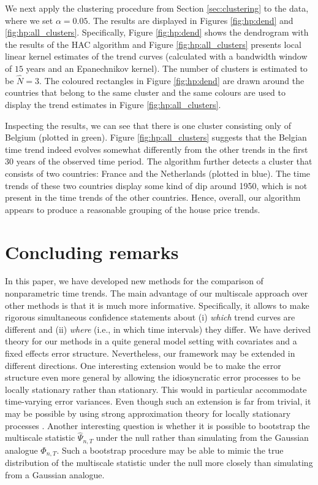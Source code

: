 \documentclass[12pt]{article}
\begin{document}
We next apply the clustering procedure from Section \ref{sec:clustering} to the data, where we set $\alpha = 0.05$. The results are displayed in Figures \ref{fig:hp:dend} and \ref{fig:hp:all_clusters}. Specifically, Figure \ref{fig:hp:dend} shows the dendrogram with the results of the HAC algorithm and Figure \ref{fig:hp:all_clusters} presents local linear kernel estimates of the trend curves (calculated with a bandwidth window of $15$ years and an Epanechnikov kernel). The number of clusters is estimated to be $\widehat{N} = 3$. The coloured rectangles in Figure \ref{fig:hp:dend} are drawn around the countries that belong to the same cluster and the same colours are used to display the trend estimates in Figure \ref{fig:hp:all_clusters}.


Inspecting the results, we can see that there is one cluster consisting only of Belgium (plotted in green). Figure \ref{fig:hp:all_clusters} suggests that the Belgian time trend indeed evolves somewhat differently from the other trends in the first $30$ years of the observed time period. %
The algorithm further detects a cluster that consists of two countries: France and the Netherlands (plotted in blue). The time trends of these two countries display some kind of dip around 1950, which is not present in the time trends of the other countries. 
Hence, overall, our algorithm appears to produce a reasonable grouping of the house price trends.



\section{Concluding remarks}


In this paper, we have developed new methods for the comparison of nonparametric time trends. The main advantage of our multiscale approach over other methods is that it is much more informative. Specifically, it allows to make rigorous simultaneous confidence statements about (i) \textit{which} trend curves are different and (ii) \textit{where} (i.e., in which time intervals) they differ. We have derived theory for our methods in a quite general model setting with covariates and a fixed effects error structure. Nevertheless, our framework may be extended in different directions. One interesting extension would be to make the error structure even more general by allowing the idiosyncratic error processes to be locally stationary rather than stationary. This would in particular accommodate time-varying error variances. Even though such an extension is far from trivial, it may be possible by using strong approximation theory for locally stationary processes \citep[][]{WuZhou2011}. Another interesting question is whether it is possible to bootstrap the multiscale statistic $\widehat{\Psi}_{n,T}$ under the null rather than simulating from the Gaussian analogue $\Phi_{n,T}$. Such a bootstrap procedure may be able to mimic the true distribution of the multiscale statistic under the null more closely than simulating from a Gaussian analogue.  




{\small
\setlength{\bibsep}{0.6em}
}
\end{document}
